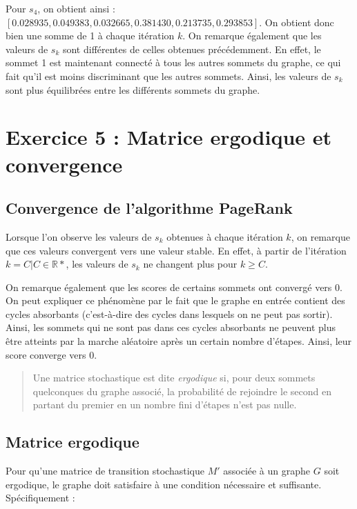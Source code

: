 Pour $s_4$, on obtient ainsi : $[0.028935, 0.049383, 0.032665, 0.381430, 0.213735, 0.293853]$. On obtient donc bien une somme de 1 à chaque itération $k$. On remarque également que les valeurs de $s_k$ sont différentes de celles obtenues précédemment. En effet, le sommet 1 est maintenant connecté à tous les autres sommets du graphe, ce qui fait qu'il est moins discriminant que les autres sommets. Ainsi, les valeurs de $s_k$ sont plus équilibrées entre les différents sommets du graphe.

\section{Exercice 5 : Matrice ergodique et convergence}

\subsection{Convergence de l'algorithme PageRank}
Lorsque l'on observe les valeurs de $s_k$ obtenues à chaque itération $k$, on remarque que ces valeurs convergent vers une valeur stable. En effet, à partir de l'itération $k = C | C \in \mathbb{R}*$, les valeurs de $s_k$ ne changent plus pour $k \geq C$.

On remarque également que les scores de certains sommets ont convergé vers 0. On peut expliquer ce phénomène par le fait que le graphe en entrée contient des cycles absorbants (c'est-à-dire des cycles dans lesquels on ne peut pas sortir). Ainsi, les sommets qui ne sont pas dans ces cycles absorbants ne peuvent plus être atteints par la marche aléatoire après un certain nombre d'étapes. Ainsi, leur score converge vers 0.

\begin{quotation}
    Une matrice stochastique est dite \textit{ergodique} si, pour deux sommets quelconques du graphe associé, la probabilité de rejoindre le second en partant du premier en un nombre fini d'étapes n'est pas nulle.
\end{quotation}

\subsection{Matrice ergodique}

Pour qu'une matrice de transition stochastique $M'$ associée à un graphe $G$ soit ergodique, le graphe doit satisfaire à une condition nécessaire et suffisante. Spécifiquement :

